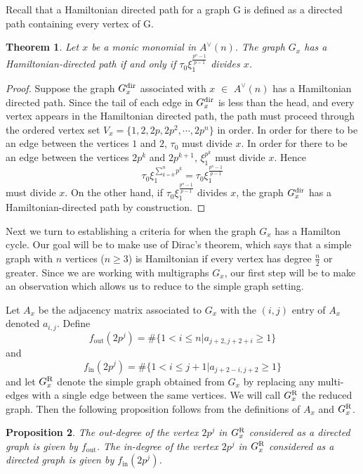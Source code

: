 \documentclass{amsart}
\newtheorem{theorem}{Theorem}[section]
\newtheorem{proposition}[theorem]{Proposition}
\theoremstyle{definition}
\theoremstyle{plain}
\numberwithin{theorem}{section}
\numberwithin{equation}{section}
\numberwithin{figure}{section}
\DeclareMathOperator{\out}{out}
\DeclareMathOperator{\inn}{in}
\newcommand{\0}{\langle 0 \rangle }
\begin{document}
Recall that a Hamiltonian directed path for a graph G is defined as a directed path containing every vertex of G. 

\begin{theorem}
Let $x$ be a monic monomial in $A^\vee (n)$. The graph $G_x$ has a Hamiltonian-directed path if and only if $\tau_0 \xi_1^{\frac{p^{n}-1}{p-1}}$ divides $x$.
\end{theorem}

\begin{proof} Suppose the graph $G^\textup{dir}_x$ associated with $x$ $\in$ $A^\vee(n)$ has a Hamiltonian directed path. Since the tail of each edge in $G_x^\textup{dir}$ is less than the head, and every vertex appears in the Hamiltonian directed path, the path must proceed through the ordered vertex set $V_x = \{1, 2, 2p, 2p^2, \cdots, 2p^n\}$ in order. In order for there to be an edge between the vertices $1$ and $2$, $\tau_0$ must divide $x$. In order for there to be an edge between the vertices $2p^{k}$ and $2p^{k + 1}$, $\xi_1^{{p^k}}$ must divide $x$. Hence 
\[
\tau_0 \xi_1^{\sum_{k = 0}^n p^k} = \tau_0 \xi_1^{\frac{p^{n}-1}{p-1}}
\]
must divide $x$. On the other hand, if $\tau_0 \xi_1^{\frac{p^{n}-1}{p-1}}$ divides $x$, the graph $G_x^\textup{dir}$ has a Hamiltonian-directed path by construction.  
\end{proof}

Next we turn to establishing a criteria for when the graph $G_x$ has a Hamilton cycle. Our goal will be to make use of Dirac's theorem, which says that a simple graph with $n$ vertices (${\displaystyle n\geq 3}$) is Hamiltonian if every vertex has degree ${\displaystyle {\tfrac {n}{2}}}$ or greater. Since we are working with multigraphs $G_x$, our first step will be to make an observation which allows us to reduce to the simple graph setting. 

Let $A_x$ be the adjacency matrix associated to $G_x$ with the $(i,j)$ entry of $A_x$ denoted $a_{i,j}$.
Define
    \[
    f_{\out} (2p^j) = \#\{1 < i \leq n | a_{j + 2, j + 2 + i} \geq 1\}
    \]
    and 
    \[
    f_{\inn} (2p^j) = \#\{1 < i \leq j+1 | a_{j + 2 -i, j + 2} \geq 1\}
    \] 
and let $G_x^\textup{R}$ denote the simple graph obtained from $G_x$ by replacing any multi-edges with a single edge between the same vertices. We will call $G_x^\textup{R}$ the reduced graph. Then the following proposition follows from the definitions of $A_x$ and $G_x^\textup{R}$.

\begin{proposition}  \label{lem:oddprimeInOutDeg}
    The out-degree of the vertex $2p^j$ in $G_x^\textup{R}$ considered as a directed graph is given by $f_{\out}$. The in-degree of the vertex $2p^j$ in $G_x^\textup{R}$ considered as a directed graph is given by $f_{\inn} (2p^j)$.
\end{proposition}
\end{document}
